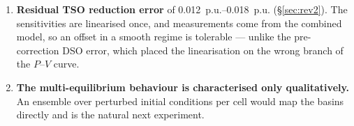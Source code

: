 \documentclass[11pt,a4paper]{article}
\newcommand{\pu}{\ensuremath{\mathrm{p.u.}}}
\begin{document}
\begin{enumerate}
    of six generators; \texttt{gen 9} is excluded because the static screening
    diverges on it. No N-1 \emph{completeness} claim is made, and line outages
    --- which the RMS adapter does not yet deliver --- are untested.
  \item \textbf{Residual TSO reduction error} of \SIrange{0.012}{0.018}{\pu}
    (\S\ref{sec:rev2}). The sensitivities are linearised once, and measurements
    come from the combined model, so an offset in a smooth regime is tolerable
    --- unlike the pre-correction DSO error, which placed the linearisation on
    the wrong branch of the $P$--$V$ curve.
  \item \textbf{The multi-equilibrium behaviour is characterised only
    qualitatively.} An ensemble over perturbed initial conditions per cell would
    map the basins directly and is the natural next experiment.
\end{enumerate}
\end{document}
